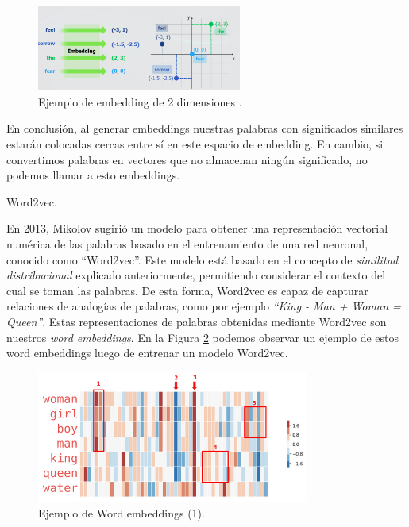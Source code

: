 \documentclass[12pt,a4paper]{article}
\makeatletter
\renewcommand\paragraph{\@startsection{paragraph}{4}{\z@}
            {-2.5ex\@plus -1ex \@minus -.25ex}
            {1.25ex \@plus .25ex}
            {\normalfont\normalsize\bfseries}}
\makeatother
\begin{document}
\begin{sloppypar}
\begin{figure}[H]    
 \centering
 \includegraphics[width=0.6\textwidth]{images/NLP/12.png}
 \caption{ Ejemplo de embedding de 2 dimensiones \cite{NLP_28}.}
 \label{fig:Imagen_NLP_12}
\end{figure}

En conclusión, al generar embeddings nuestras palabras con significados similares estarán colocadas cercas entre sí en este espacio de embedding. En cambio, si convertimos palabras en vectores que no almacenan ningún significado, no podemos llamar a esto embeddings. 

\cleardoublepage

\paragraph{Word2vec.}\label{word2vec}

En 2013, Mikolov\cite{NLP_11} sugirió un modelo para obtener una representación vectorial numérica de las palabras basado en el entrenamiento de una red neuronal, conocido como “Word2vec”. Este modelo está basado en el concepto de \textit{similitud distribucional} explicado anteriormente, permitiendo considerar el contexto del cual se toman las palabras. De esta forma, Word2vec es capaz de capturar relaciones de analogías de palabras, como por ejemplo \textit{“King - Man + Woman = Queen”}. Estas representaciones de palabras obtenidas mediante Word2vec son nuestros \textit{word embeddings}. En la Figura \ref{fig:Imagen_NLP_13} podemos observar un ejemplo de estos word embeddings luego de entrenar un modelo Word2vec.

\begin{figure}[H]    
 \centering
 \includegraphics[width=0.8\textwidth]{images/NLP/13.png}
 \caption{Ejemplo de Word embeddings (1)\cite{datitos_nlp}.}
 \label{fig:Imagen_NLP_13}
\end{figure}


\end{sloppypar}
\end{document}
